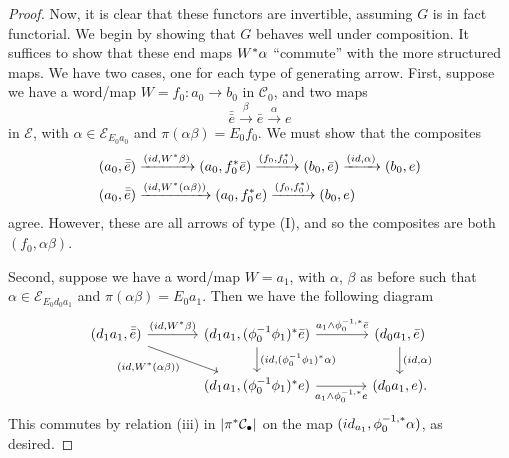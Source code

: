 \documentclass[a4paper,10pt
,draft
]{article}%
\renewcommand{\1}{\eta}%
\begin{document}
\begin{proof}
      Now, it is clear that these functors are invertible, assuming $G$ is in fact functorial.
      We begin by showing that $G$ behaves well under composition.
      It suffices to show that these end maps $W^{\**}\alpha$ ``commute'' with the more structured maps.
      We have two cases, one for each type of generating arrow.
      First, suppose we have a word/map $W = f_0: a_0 \to b_0$ in $\mathcal C_0$, and two maps
      \begin{equation}
            \bar{\bar e} \xrightarrow{\beta} \bar e \xrightarrow{\alpha} e            
      \end{equation}
      in $\mathcal E$, with $\alpha \in \mathcal E_{E_0 a_0}$ and $\pi(\alpha\beta) = E_0 f_0$.
      We must show that the composites
      \begin{align*}
        (a_0, \bar{\bar e}) & \xrightarrow{(id, W^{\**}\beta)}
                              (a_0, f_0^{\**} \bar e) \xrightarrow{(f_0, f_0^{\**})}
                              (b_0, \bar e) \xrightarrow{(id, \alpha)}
                              (b_0, e)
        \\
        (a_0, \bar{\bar e}) & \xrightarrow{(id, W^{\**}(\alpha\beta))}
                              (a_0, f_0^{\**} e) \xrightarrow{(f_0, f_0^{\**})}
                              (b_0, e)
      \end{align*}
      agree. However, these are all arrows of type (I), and so the composites are both $(f_0, \alpha\beta)$.

      Second, suppose we have a word/map $W = a_1$, with $\alpha$, $\beta$ as before such that $\alpha \in \mathcal E_{E_0 d_0 a_1}$ and $\pi(\alpha\beta) = E_0 a_1$.
      Then we have the following diagram
      \begin{equation}
            \begin{tikzcd}[column sep = large]
                  (d_1 a_1, \bar{\bar e}) \arrow[r, "{(id, W^{\**} \beta)}"] \arrow[dr, "{(id, W^{\**}(\alpha\beta))}"']
                  &
                  (d_1 a_1, (\phi_0^{-1} \phi_1)^{\**} \bar e) \arrow[d, "{(id, (\phi_0^{-1} \phi_1)^{\**} \alpha)}"] \arrow[r, "a_1 \wedge \phi_0^{-1,\**} \bar e"]
                  &
                  (d_0 a_1, \bar e) \arrow[d, "{(id, \alpha)}"]
                  \\
                  &
                  (d_1 a_1, (\phi_0^{-1} \phi_1)^{\**} e) \arrow[r, "a_1 \wedge \phi_0^{-1,\**} e"']
                  &
                  (d_0 a_1, e).
            \end{tikzcd}
      \end{equation}
      This commutes by relation (iii) in $|\pi^{\**} \mathcal C_\bullet|$ on the map $(id_{a_1}, \phi_0^{-1,\**}\alpha)$,
      as desired.


\end{proof}
\end{document}
